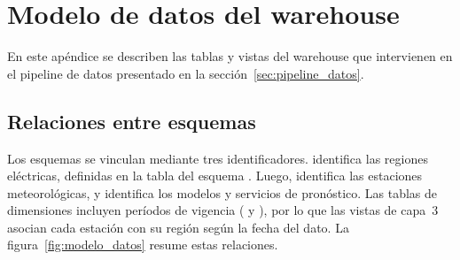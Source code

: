 
\chapter{Modelo de datos del warehouse} %

\label{AppendixA}

En este apéndice se describen las tablas y vistas del warehouse  que intervienen en el pipeline de datos presentado en la sección~\ref{sec:pipeline_datos}. 

\section{Relaciones entre esquemas}
\label{sec:apendice_relaciones}

Los esquemas se vinculan mediante tres identificadores.  identifica las regiones eléctricas, definidas en la tabla  del esquema . Luego,  identifica las estaciones meteorológicas, y  identifica los modelos y servicios de pronóstico. Las tablas de dimensiones incluyen períodos de vigencia ( y ), por lo que las vistas de capa~3 asocian cada estación con su región según la fecha del dato. La figura~\ref{fig:modelo_datos} resume estas relaciones.

